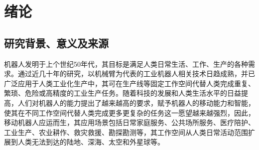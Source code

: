 \chapter{绪论} \label{chap:introduction}

\section{研究背景、意义及来源}

机器人发明于上个世纪50年代，其目标是满足人类日常生活、工作、生产的各种需求。通过近几十年的研究，以机械臂为代表的工业机器人相关技术日趋成熟，并已广泛应用于人类工业化生产中，其可在生产线等固定工作空间代替人类完成重复、繁琐、危险或高精度的工业生产任务。随着科技的发展和人类生活水平的日益提高，人们对机器人的能力提出了越来越高的要求，赋予机器人的移动能力和智能，使其在不同工作空间代替人类完成更多更复杂的任务这一愿望越来越强烈，因此，移动机器人应运而生，其应用场景包括日常家庭服务、公共场所服务、医疗陪护、工业生产、农业耕作、救灾救援、勘探勘测等，其工作空间从人类日常活动范围扩展到人类无法到达的陆地、深海、太空和外星球等。

